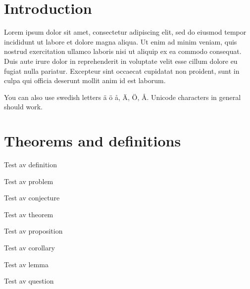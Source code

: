 \clearpage{\thispagestyle{empty}\cleardoublepage}
\section{Introduction}

Lorem ipsum dolor sit amet, consectetur adipiscing elit, sed do eiusmod tempor incididunt ut labore et dolore magna aliqua.
Ut enim ad minim veniam, quis nostrud exercitation ullamco laboris nisi ut aliquip ex ea commodo consequat. 
Duis aute irure dolor in reprehenderit in voluptate velit esse cillum dolore eu fugiat nulla pariatur. 
Excepteur sint occaecat cupidatat non proident, sunt in culpa qui officia deserunt mollit anim id est laborum.

You can also use swedish letters ä ö å, Ä, Ö, Å. Unicode characters in general should work.


\clearpage{\thispagestyle{empty}\cleardoublepage}
\section{Theorems and definitions}

\begin{definition}
	Test av definition
\end{definition}

\begin{problem}
	Test av problem
\end{problem}

\begin{conjecture}
	Test av conjecture
\end{conjecture}

\begin{theorem}
	Test av theorem
\end{theorem}

\begin{proposition}
	Test av proposition
\end{proposition}

\begin{corollary}
	Test av corollary
\end{corollary}

\begin{lemma}
	Test av lemma
\end{lemma}

\begin{question}
	Test av question
\end{question}

